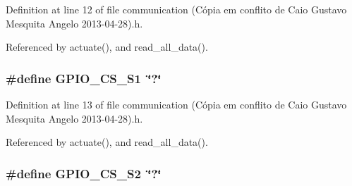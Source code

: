 Definition at line 12 of file communication (\-Cópia em conflito de Caio Gustavo Mesquita Angelo 2013-\/04-\/28).\-h.



Referenced by actuate(), and read\-\_\-all\-\_\-data().

\hypertarget{communication_01_07C_xC3_xB3pia_01em_01conflito_01de_01Caio_01Gustavo_01Mesquita_01Angelo_012013-04-28_08_8h_a7672ba13ff6f297c347790586c9a02e0}{
\subsubsection[{G\-P\-I\-O\-\_\-\-C\-S\-\_\-\-S1}]{\setlength{\rightskip}{0pt plus 5cm}\#define G\-P\-I\-O\-\_\-\-C\-S\-\_\-\-S1~\char`\"{}?\char`\"{}}}\label{communication_01_07C_xC3_xB3pia_01em_01conflito_01de_01Caio_01Gustavo_01Mesquita_01Angelo_012013-04-28_08_8h_a7672ba13ff6f297c347790586c9a02e0}


Definition at line 13 of file communication (\-Cópia em conflito de Caio Gustavo Mesquita Angelo 2013-\/04-\/28).\-h.



Referenced by actuate(), and read\-\_\-all\-\_\-data().

\hypertarget{communication_01_07C_xC3_xB3pia_01em_01conflito_01de_01Caio_01Gustavo_01Mesquita_01Angelo_012013-04-28_08_8h_a94b6d57532d1db55dc4efd9fb234f156}{
\subsubsection[{G\-P\-I\-O\-\_\-\-C\-S\-\_\-\-S2}]{\setlength{\rightskip}{0pt plus 5cm}\#define G\-P\-I\-O\-\_\-\-C\-S\-\_\-\-S2~\char`\"{}?\char`\"{}}}\label{communication_01_07C_xC3_xB3pia_01em_01conflito_01de_01Caio_01Gustavo_01Mesquita_01Angelo_012013-04-28_08_8h_a94b6d57532d1db55dc4efd9fb234f156}


